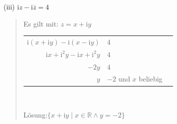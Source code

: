 (iii)\;\; $\mathrm{i}z-\mathrm{i} \overline{z}=4$\\
\begin{quote}
Es gilt mit: $ z=x+\mathrm{i}y $\\
	\begin{center}
	
	\begin{tabular}[t]{r@{$=$}ll}%
		$\mathrm{i}(x+\mathrm{i}y)-\mathrm{i}(x-\mathrm{i}y)$ & $4$\\
		$\mathrm{i}x+\mathrm{i}^2y-\mathrm{i}x+\mathrm{i}^2y$ & $4 $ \\	
		$ -2y $&$ 4 $\\
		$ y $&$-2  $ und $ x $ beliebig\\
	\end{tabular} \\
\end{center}
Lösung:$ \{ x+\mathrm{i}y\;|\;x\in \mathbb{R}\wedge y=-2\} $
\end{quote}

